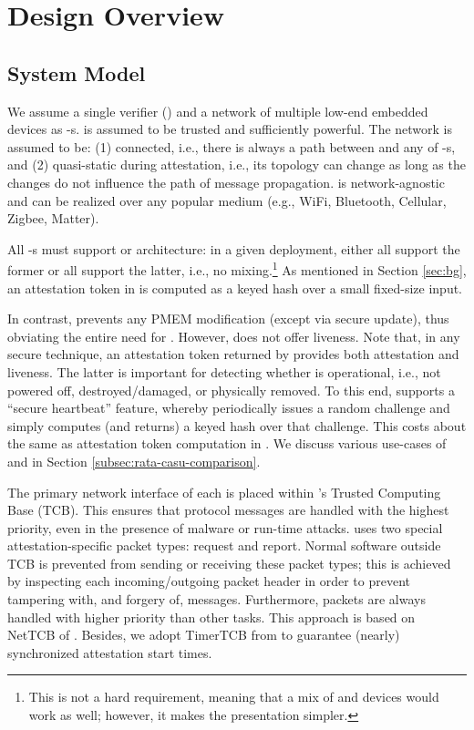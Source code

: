 \section{Design Overview \label{design}} 
%
\subsection{System Model}
We assume a single verifier (\vrf) and a network of multiple low-end embedded devices as 
\prv-s. \vrf is assumed to be trusted and sufficiently powerful. 
The network is assumed to be: (1) connected, i.e., there is always a path between \vrf and any of  
\prv-s, and (2) quasi-static during attestation, i.e., its topology can change as long as the changes 
do not influence the path of message propagation. \system is network-agnostic and can be 
realized over any popular medium (e.g., WiFi, Bluetooth, Cellular, Zigbee, Matter).

All \prv-s must support \rata or \casu architecture: in a given deployment, either all support
the former or all support the latter, i.e., no mixing.\footnote{This is not a hard requirement,
meaning that a mix of \rata and \casu devices would work as well;
however, it makes the presentation simpler.}
As mentioned in Section \ref{sec:bg}, an attestation token in 
\rata is computed as a keyed hash over a small fixed-size input.

In contrast, \casu prevents any PMEM modification (except via secure update), 
thus obviating the entire need for \ra. However, \casu does not offer \prv liveness.
Note that, in any secure \ra technique, an attestation token returned by \prv 
provides both attestation and \prv liveness.
The latter is important for detecting whether \prv is operational, i.e., not powered off, 
destroyed/damaged, or physically removed. 
To this end, \casu supports a ``secure heartbeat'' feature, whereby 
\vrf periodically issues a random challenge and \prv simply computes (and returns) a keyed 
hash over that challenge. This costs about the same as attestation token computation in \rata. 
We discuss various use-cases of \rata and \casu in Section \ref{subsec:rata-casu-comparison}.

The primary network interface of each \prv is placed within \system's Trusted Computing Base (TCB). 
This ensures that \system protocol messages are handled with the highest 
priority, even in the presence of malware or run-time attacks.
\system uses two special attestation-specific packet types: request and report. 
Normal software outside TCB is prevented from sending or receiving these packet types;
this is achieved by inspecting each incoming/outgoing packet header
in order to prevent tampering with, and forgery of, \system messages. Furthermore, 
\system packets are always handled with higher priority than other tasks. 
This approach is based on NetTCB of \garota \cite{garota}.
Besides, we adopt TimerTCB from \garota to guarantee (nearly) synchronized attestation start times.

